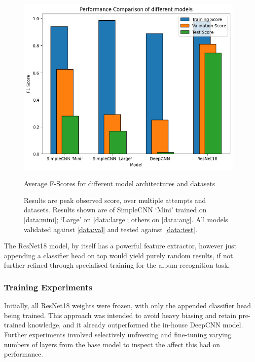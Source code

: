                 \begin{figure}[h]
                    \centering
                    \includegraphics[width=\textwidth]{images/ModelComparison.png}
                    \caption{Average F-Scores for different model architectures and datasets}
                    \label{fig:CNNSize_Time}
                    \caption*{Results are peak observed score, over multiple attempts and datasets. Results shown are of SimpleCNN `Mini' trained on \ref{data:mini}; `Large' on \ref{data:large}; others on \ref{data:aug}. All models validated against \ref{data:val} and tested against \ref{data:test}.}
                \end{figure}
    
                The ResNet18 model, by itself has a powerful feature extractor, however just appending a classifier head on top would yield purely random results, if not further refined through specialised training for the album-recognition task.
    
                \subsubsection{Training Experiments}
    
                    Initially, all ResNet18 weights were frozen, with only the appended classifier head being trained. This approach was intended to avoid heavy biasing and retain pre-trained knowledge, and it already outperformed the in-house DeepCNN model. Further experiments involved selectively unfreezing and fine-tuning varying numbers of layers from the base model to inspect the affect this had on performance.
    

